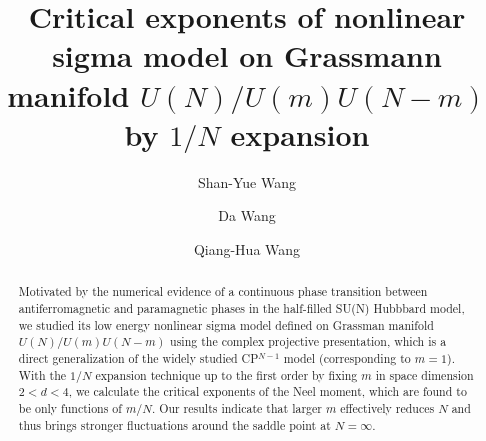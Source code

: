 \documentclass[aps,twocolumn,superscriptaddress]{revtex4-1}
\begin{document}
\title{Critical exponents of nonlinear sigma model on Grassmann manifold $U(N)/U(m)U(N-m)$ by $1/N$ expansion}
\author{Shan-Yue Wang}
\author{Da Wang} %
\author{Qiang-Hua Wang} %
\begin{abstract}
  Motivated by the numerical evidence of a continuous phase transition between antiferromagnetic and paramagnetic phases
  in the half-filled SU(N) Hubbbard model, we studied its low energy nonlinear sigma model defined on Grassman manifold
  $U(N)/U(m)U(N-m)$ using the complex projective presentation, which is a direct generalization of the widely studied
  CP$^{N-1}$ model (corresponding to $m=1$). With the $1/N$ expansion technique up to the first order by fixing $m$ in space dimension
  $2<d<4$, we calculate the critical exponents of the Neel moment, which are found to be only functions of $m/N$. Our
  results indicate that larger $m$ effectively reduces $N$ and thus brings stronger fluctuations around the saddle point at $N=\infty$.
\end{abstract}
\maketitle
\end{document}
